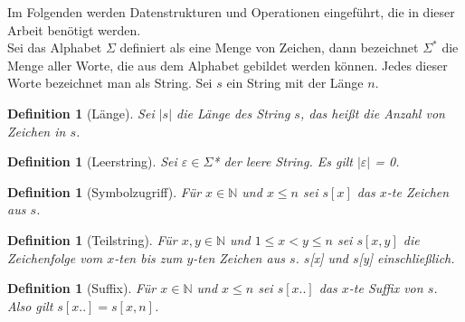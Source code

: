 \documentclass[a4paper,11pt]{scrartcl}%
\theoremstyle{change}
\theoremstyle{nonumberplain}
\theoremstyle{change}
\newtheorem{definition}[theorem]{Definition}
\theoremstyle{nonumberplain}
\theoremstyle{change}
\theoremstyle{nonumberplain}
\begin{document}
	Im Folgenden werden Datenstrukturen und Operationen eingeführt, die in dieser Arbeit benötigt werden.\\
	Sei das Alphabet $\Sigma$ definiert als eine Menge von Zeichen, dann bezeichnet $\Sigma^{*}$ die Menge aller Worte, die aus dem Alphabet gebildet werden können. Jedes dieser Worte bezeichnet man als String.
	Sei $s$ ein String mit der Länge $n$.
	
	\begin{definition}[Länge]
		Sei $|s|$ die Länge des String $s$, das heißt die Anzahl von Zeichen in $s$.
	\end{definition}
	
	\begin{definition}[Leerstring]
		Sei $\varepsilon \in \Sigma$* der leere String. Es gilt $|\varepsilon|$ = 0.
	\end{definition}
	
	\begin{definition}[Symbolzugriff]
		Für $x \in \mathbb{N}$ und $x \leq n$ sei $s[x]$ das $x$-te Zeichen aus $s$.
	\end{definition}
	
	\begin{definition}[Teilstring]
		Für $x,y \in \mathbb{N}$ und $1 \leq x < y \leq n$ sei $s[x,y]$ die Zeichenfolge vom $x$-ten bis zum $y$-ten Zeichen aus $s$. $s$[x] und $s$[y] einschließlich.
	\end{definition}
	
	\begin{definition}[Suffix]
		 Für $x \in \mathbb{N}$ und $x \leq n$ sei $s[x..]$ das $x$-te Suffix von $s$. Also gilt $s[x..] = s[x,n]$.
	\end{definition}
	
\end{document}
